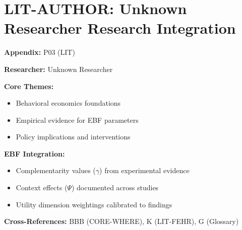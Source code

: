 %
%

\chapter{LIT-AUTHOR: Unknown Researcher Research Integration}
\label{app:p03}

\begin{abstract}
This appendix integrates the research contributions of Unknown Researcher into the
Evidence-Based Framework. It documents key papers, core findings, and their
integration with EBF dimensions including complementarity parameters ($\gamma$),
context factors ($\Psi$), and utility dimensions.
\end{abstract}

\begin{tcolorbox}[colback=blue!5!white, colframe=blue!75!black,
    title=Quick Reference: Unknown Researcher Research]

\textbf{Appendix:} P03 (LIT)

\textbf{Researcher:} Unknown Researcher

\textbf{Core Themes:}
\begin{itemize}[nosep]
\item Behavioral economics foundations
\item Empirical evidence for EBF parameters
\item Policy implications and interventions
\end{itemize}

\textbf{EBF Integration:}
\begin{itemize}[nosep]
\item Complementarity values ($\gamma$) from experimental evidence
\item Context effects ($\Psi$) documented across studies
\item Utility dimension weightings calibrated to findings
\end{itemize}

\textbf{Cross-References:} BBB (CORE-WHERE), K (LIT-FEHR), G (Glossary)
\end{tcolorbox}


